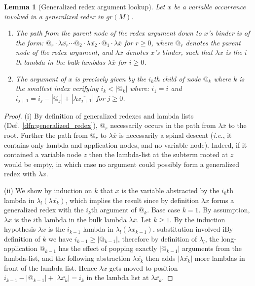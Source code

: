 \documentclass{elsarticle}
\makeatletter
\def\proofatend{\begin{proof}}
\def\endproofatend{\end{proof}}
\theoremstyle{plain}
\newtheorem{lemma}[theorem]{Lemma}
\theoremstyle{definition}
\theoremstyle{remark}
\newcommand\Nodes{\mathcal{N}}%
\newcommand\NodesApp{\Nodes_@}%
\renewcommand\ie{{\it i.e.\@\xspace}}
\makeatother
\begin{document}
\begin{lemma}[Generalized redex argument lookup]
\label{lemma:genredex_lookup}
Let $x$ be a variable occurrence involved in a generalized redex in $gr(M)$.
\begin{enumerate}[label=(\roman*), nosep]
    \item The path from the parent node of the redex argument down to $x$'s binder is of the form:
$ @_r \cdot \lambda\overline{x_r} \cdots
@_2 \cdot \lambda\overline{x_2} \cdot @_1 \cdot \lambda\overline{x}$
for $r\geq0$, where $@_r$ denotes the parent node of the redex argument, and $\lambda\overline{x}$ denotes $x$'s binder, such that $\lambda x$ is the $i$th lambda in the bulk lambdas $\lambda\overline{x}$ for $i\geq0$.

\item The argument of $x$ is precisely given by the $i_k$th child of node $@_k$ where $k$ is the smallest index verifying $i_k<|@_k|$ where: $i_1 = i$ and $i_{j+1} = i_j - |@_j| + |\lambda\overline{x_{j+1}}|$ for $j\geq 0$.
\end{enumerate}
\end{lemma}
\proofatend
(i) By definition of generalized redexes and lambda lists (Def.~\ref{dfn:generalized_redex}), $@_r$ necessarily occurs in the path from $\lambda\overline{x}$ to the root. Further the path from $@_r$ to $\lambda\overline{x}$ is necessarily a spinal descent (\ie, it contains only lambda and application nodes, and no variable node). Indeed, if it contained a variable node $z$ then the lambda-list at the subterm rooted at $z$ would be empty, in which case no argument could possibly form a generalized redex with $\lambda x$.

(ii) We show by induction on $k$ that $x$ is the variable abstracted by the $i_k$th lambda in $\lambda_l(\lambda\overline{x_k})$, which implies the result since by definition $\lambda x$ forms a generalized redex with the $i_k$th argument of $@_k$.
Base case $k=1$. By assumption, $\lambda x$ is the $i$th lambda in the bulk lambda $\lambda\overline{x}$. Let $k\geq 1$. By the induction hypothesis $\lambda x$ is the $i_{k-1}$ lambda in $\lambda_l(\lambda\overline{x_{k-1}})$.
substitution involved iBy definition of $k$ we have $i_{k-1}\geq|@_{k-1}|$, therefore by definition of $\lambda_l$, the long-application $@_{k-1}$ has the effect of popping exactly $|@_{k-1}|$ arguments from the lambda-list, and the following abstraction $\lambda\overline{x_k}$ then adds $|\lambda\overline{x_k}|$ more lambdas in front of the lambda list. Hence $\lambda x$ gets moved to position $i_{k-1} - |@_{k-1}| + |\lambda\overline{x_k}| = i_k$ in the lambda list at $\lambda\overline{x_k}$.
\endproofatend
\end{document}
